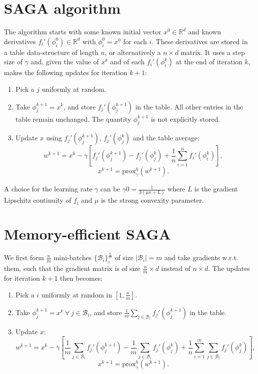 \documentclass[a4paper,11pt]{article}
\newcommand{\R}{\mathbb{R}}
\newcommand{\B}{\mathcal{B}}
\newcommand{\prox}{\textrm{prox}}
\begin{document}
\section{SAGA algorithm} \label{sec1}

The algorithm starts with some known initial vector $x^0 \in \R^d$ and known
derivatives $f_i' (\phi_i^0) \in \R^d$ with $\phi_i^0 = x^0$ for each $i$. These
derivatives are stored in a table data-structure of length $n$, or alternatively
a $n \times d$ matrix. It uses a step size of $\gamma$ and, given the value of
$x^k$ and of each $f_i' (\phi_i^k)$ at the end of iteration $k$, makes the
following updates for iteration $k+1$:
\begin{enumerate}
\item Pick a $j$ uniformly at random.
\item Take $\phi_j^{k+1} = x^k$, and store $f_j'(\phi_j^{k+1})$ in the table.
	All other entries in the table remain unchanged. The quantity $\phi_j^{k+1}$
	is not explicitly stored.
\item Update $x$ using $f_j'(\phi_j^{k+1})$, $f_j'(\phi_j^k)$ and the table
	average:
	\begin{equation} \label{eqn:saga}
	w^{k+1} = x^k - \gamma \left[ f_j'(\phi_j^{k+1}) - f_j'(\phi_j^k)
	+ \frac1n \sum_{i=1}^n f_i'(\phi_i^k) \right] ,
	\end{equation}
	$$x^{k+1} = \prox_\gamma^h (w^{k+1}).$$
\end{enumerate}

A choice for the learning rate $\gamma$ can be $\gamma0 = \frac{1}{3(\mu n + L)}$ where $L$ is the gradient Lipschitz continuity of $f_i$ and $\mu$ is the strong convexity parameter.
\section{Memory-efficient SAGA}

We first form $\frac{n}m$ mini-batches $\{\B_i\}_i^{\frac{n}m}$ of size $|\B_i|
= m$ and take gradients w.r.t. them, such that the gradient matrix is of size
$\frac{n}m \times d$ instead of $n \times d$. The updates for iteration $k+1$
then becomes:
\begin{enumerate}
\item Pick a $i$ uniformly at random in $[1, \frac{n}m]$.
\item Take $\phi_j^{k+1} = x^k \ \forall \ j \in \B_i$, and store $\frac1m
	\sum_{j\in\B_i} f_j'(\phi_j^{k+1})$ in the table.
\item Update $x$:
	\begin{equation} \label{eqn:minisaga}
	w^{k+1} = x^k - \gamma \left[ \frac1m \sum_{j\in\B_i} f_j'(\phi_j^{k+1})
	- \frac1m \sum_{j\in\B_i} f_j'(\phi_j^k)
	+ \frac1n \sum_{i=1}^m \sum_{j\in\B_i} f_j'(\phi_j^k) \right] ,
	\end{equation}
	$$x^{k+1} = \prox_\gamma^h (w^{k+1}).$$
\end{enumerate}
\end{document}
